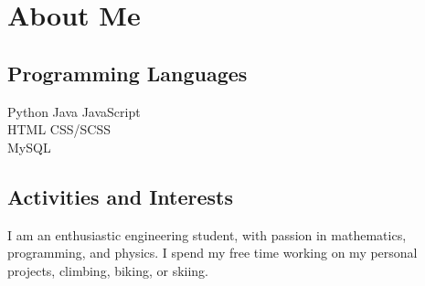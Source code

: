 \documentclass[]{deedy-resume-openfont}
\begin{document}
    \section{About Me}
    \begin{minipage}[t]{.35\textwidth}
    \subsection{Programming Languages}
    Python \textbullet{} Java \textbullet{} JavaScript  \\ 
    HTML \textbullet{} CSS/SCSS \\
    MySQL
    \sectionsep
    \end{minipage}
    \hfill
    \begin{minipage}[t]{.55\textwidth}
    \subsection{Activities and Interests}
    I am an enthusiastic engineering student, with passion in mathematics, programming, and physics. I spend my free time working on my personal projects, climbing, biking, or skiing.
    \end{minipage}
    
    
\end{document}
